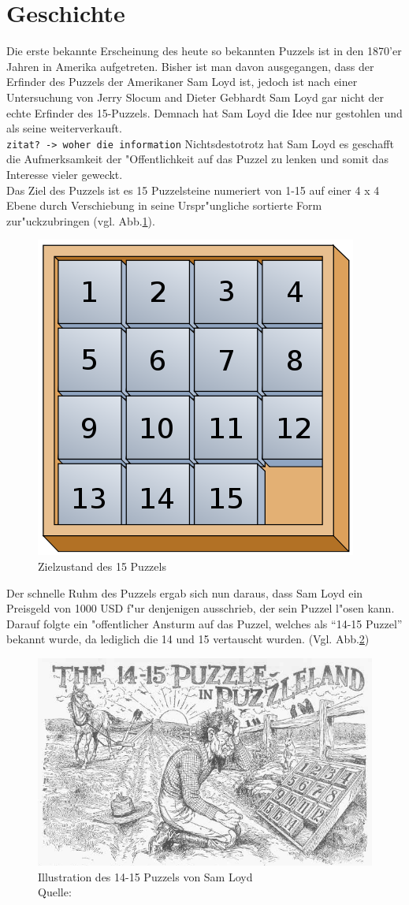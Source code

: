 \section{Geschichte} %
\label{cha:Geschichte}
Die erste bekannte Erscheinung des heute so bekannten Puzzels ist in den 1870'er Jahren in Amerika aufgetreten. Bisher ist man davon ausgegangen, dass der Erfinder des Puzzels der Amerikaner Sam Loyd ist, jedoch ist nach einer Untersuchung von Jerry Slocum and Dieter Gebhardt Sam Loyd gar nicht der echte Erfinder des 15-Puzzels. \autocite{anchor-puzzle:book, the-15-puzzle:online} Demnach hat Sam Loyd die Idee nur gestohlen und als seine weiterverkauft.\\
\texttt{zitat? -> woher die information}
Nichtsdestotrotz hat Sam Loyd es geschafft die Aufmerksamkeit der "Offentlichkeit auf das Puzzel zu lenken und somit das Interesse vieler geweckt.\\
Das Ziel des Puzzels ist es 15 Puzzelsteine numeriert von 1-15 auf einer 4 x 4 Ebene durch Verschiebung in seine Urspr"ungliche sortierte Form zur"uckzubringen (vgl. Abb.\ref{fig:puzzle-end}).
\begin{figure}[H]
    \centering
    \includegraphics[width=.3\textwidth,keepaspectratio]{img/Fifteen_puzzle.png}
    \captionsetup{format=hang}
    \caption[Zielzustand des 15 Puzzels]{\label{fig:puzzle-end}Zielzustand des 15 Puzzels}
\end{figure}
Der schnelle Ruhm des Puzzels ergab sich nun daraus, dass Sam Loyd ein Preisgeld von 1000 USD f"ur denjenigen ausschrieb, der sein Puzzel l"osen kann. Darauf folgte ein "offentlicher Ansturm auf das Puzzel, welches als \enquote{14-15 Puzzel} bekannt wurde, da lediglich die 14 und 15 vertauscht wurden. (Vgl. Abb.\ref{fig:puzzle-illustration})
\begin{figure}[H]
    \centering
    \includegraphics[width=.6\textwidth,keepaspectratio]{img/sam-loyd-puzzle-illustration.jpg}
    \captionsetup{format=hang}
    \caption[Illustration des 14-15 Puzzels von Sam Loyd]{\label{fig:puzzle-illustration}Illustration des 14-15 Puzzels von Sam Loyd \\Quelle: \cite[pp. 234-235]{loyd-cyclopedia:book}}
\end{figure}
